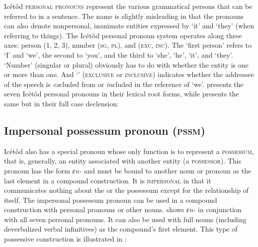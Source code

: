 Icétôd \textsc{personal pronouns} represent the various grammatical persons that can be referred to in a sentence. The name is slightly misleading in that the pronouns can also denote nonpersonal, inanimate entities expressed by ‘it’ and ‘they’ (when referring to things). The Icétôd personal pronoun system operates along three axes: person (1, 2, 3), number (\textsc{sg}, \textsc{pl}), and  (\textsc{exc}, \textsc{inc}). The ‘first person’ refers to ‘I’ and ‘we’, the second to ‘you’, and the third to ‘she’, ‘he’, ‘it’, and ‘they’. ‘Number’ (singular or plural) obviously has to do with whether the entity is one or more than one. And ‘’ (\textsc{exclusive} or \textsc{inclusive}) indicates whether the addressee of the speech is \textit{ex}cluded from or \textit{in}cluded in the reference of ‘we’.  presents the seven Icétôd personal pronouns in their lexical root forms, while  presents the same but in their full case declension:
\newpage 

 

\subsection{Impersonal possessum pronoun (\textsc{pssm})}\label{sec:5.3}


Icétôd also has a special pronoun whose only function is to represent a \textsc{possessum}, that is, generally, an entity associated with another entity (a \textsc{possessor}). This pronoun has the form \textit{ɛn{\Í}-} and must be bound to another noun or pronoun as the last element in a compound construction. It is \textsc{impersonal} in that it communicates nothing about the  or the possessum except for the relationship of  itself. The impersonal possessum pronoun can be used in a compound construction with personal pronouns or other nouns.  shows \textit{ɛn{\Í}-} in conjunction with all seven personal pronouns. It can also be used with full nouns (including deverbalized verbal infinitives) as the compound’s first element. This type of possessive construction is illustrated in :


